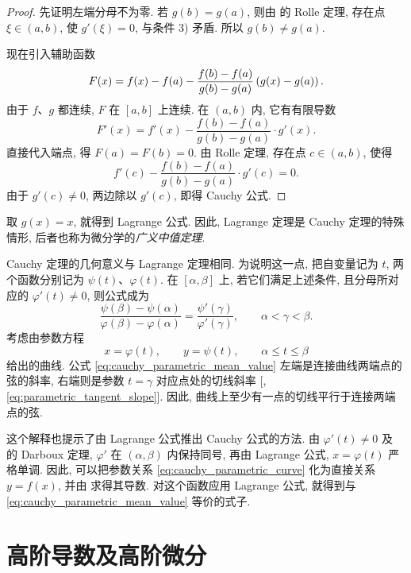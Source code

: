 \begin{proof}
先证明左端分母不为零.
若 $g(b)=g(a)$, 则由  的 Rolle 定理,
存在点 $\xi\in(a,b)$, 使 $g'(\xi)=0$, 与条件 3) 矛盾.
所以 $g(b)\neq g(a)$.

现在引入辅助函数
$$
F(x)=f(x)-f(a)-\frac{f(b)-f(a)}{g(b)-g(a)}\left( g(x)-g(a) \right).
$$
由于 $f$、$g$ 都连续, $F$ 在 $[a,b]$ 上连续.
在 $(a,b)$ 内, 它有有限导数
$$
F'(x)=f'(x)-\frac{f(b)-f(a)}{g(b)-g(a)}\cdot g'(x).
$$
直接代入端点, 得 $F(a)=F(b)=0$.
由 Rolle 定理, 存在点 $c\in(a,b)$, 使得
$$
f'(c)-\frac{f(b)-f(a)}{g(b)-g(a)}\cdot g'(c)=0.
$$
由于 $g'(c)\neq0$, 两边除以 $g'(c)$, 即得 Cauchy 公式.
\end{proof}

取 $g(x)=x$, 就得到 Lagrange 公式.
因此, Lagrange 定理是 Cauchy 定理的特殊情形,
后者也称为微分学的\emph{广义中值定理}.

Cauchy 定理的几何意义与 Lagrange 定理相同.
为说明这一点, 把自变量记为 $t$, 两个函数分别记为 $\psi(t)$、$\varphi(t)$.
在 $[\alpha,\beta]$ 上, 若它们满足上述条件, 且分母所对应的 $\varphi'(t)\neq0$,
则公式成为
\begin{equation}\label{eq:cauchy_parametric_mean_value}
\frac{\psi(\beta)-\psi(\alpha)}{\varphi(\beta)-\varphi(\alpha)}
=\frac{\psi'(\gamma)}{\varphi'(\gamma)},
\qquad\alpha<\gamma<\beta.
\end{equation}
考虑由参数方程
\begin{equation}\label{eq:cauchy_parametric_curve}
x=\varphi(t),\qquad y=\psi(t),\qquad\alpha\leq t\leq\beta
\end{equation}
给出的曲线.
公式 \eqref{eq:cauchy_parametric_mean_value} 左端是连接曲线两端点的弦的斜率,
右端则是参数 $t=\gamma$ 对应点处的切线斜率
[, \eqref{eq:parametric_tangent_slope}].
因此, 曲线上至少有一点的切线平行于连接两端点的弦.

\begin{remark}
这个解释也提示了由 Lagrange 公式推出 Cauchy 公式的方法.
由 $\varphi'(t)\neq0$ 及  的 Darboux 定理,
$\varphi'$ 在 $(\alpha,\beta)$ 内保持同号,
再由 Lagrange 公式, $x=\varphi(t)$ 严格单调.
因此, 可以把参数关系 \eqref{eq:cauchy_parametric_curve} 化为直接关系 $y=f(x)$,
并由  求得其导数.
对这个函数应用 Lagrange 公式,
就得到与 \eqref{eq:cauchy_parametric_mean_value} 等价的式子.
\end{remark}

\section{高阶导数及高阶微分}\label{sec:higher_derivatives_differentials}
